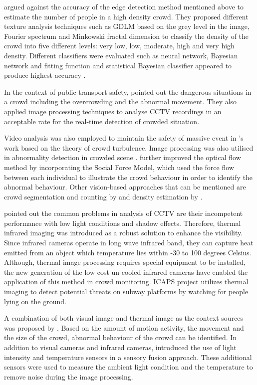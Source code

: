 \citet{Marana1997} argued against the accuracy of the edge detection method mentioned above to estimate the number of people in a high density crowd. They proposed different texture analysis techniques such as GDLM based on the grey level in the image, Fourier spectrum and Minkowski fractal dimension \citep{Marana1999} to classify the density of the crowd into five different levels: very low, low, moderate, high and very high density. Different classifiers were evaluated such as neural network, Bayesian network and fitting function and statistical Bayesian classifier appeared to produce highest accuracy \citep{Marana1998}.

In the context of public transport safety, \citet{Velastin1999} pointed out the dangerous situations in a crowd including the overcrowding and the abnormal movement. They also applied image processing techniques to analyse CCTV recordings in an acceptable rate for the real-time detection of crowded situation.

Video analysis was also employed to maintain the safety of massive event in \citet{Johansson2008}’s work based on the theory of crowd turbulence. Image processing was also utilised in abnormality detection in crowded scene \citep{Mahadevan2010, Mehran2009}. \citet{Mehran2009} further improved the optical flow method by incorporating the Social Force Model, which used the force flow between each individual to illustrate the crowd behaviour in order to identify the abnormal behaviour. Other vision-based approaches that can be mentioned are crowd segmentation and counting by \citet{Chan2008} and density estimation by \citet{Li2010}.

\citet{Andersson2009} pointed out the common problems in analysis of CCTV are their incompetent performance with low light conditions and shadow effects. Therefore, thermal infrared imaging was introduced as a robust solution to enhance the visibility. Since infrared cameras operate in long wave infrared band, they can capture heat emitted from an object which temperature lies within -30 to 100 degrees Celsius. Although, thermal image processing requires special equipment to be installed, the new generation of the low cost un-cooled infrared cameras have enabled the application of this method in crowd monitoring. ICAPS project \citep{Pham2007} utilizes thermal imaging to detect potential threats on subway platforms by watching for people lying on the ground.

A combination of both visual image and thermal image as the context sources was proposed by \citet{Andersson2009}. Based on the amount of motion activity, the movement and the size of the crowd, abnormal behaviour of the crowd can be identified. In addition to visual cameras and infrared cameras, \citet{Yaseen2013} introduced the use of light intensity and temperature sensors in a sensory fusion approach. These additional sensors were used to measure the ambient light condition and the temperature to remove noise during the image processing.

